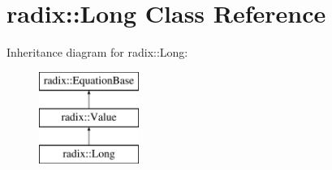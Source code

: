 \hypertarget{classradix_1_1Long}{}\section{radix\+:\+:Long Class Reference}
\label{classradix_1_1Long}
Inheritance diagram for radix\+:\+:Long\+:\begin{figure}[H]
\begin{center}
\leavevmode
\includegraphics[height=3.000000cm]{classradix_1_1Long}
\end{center}
\end{figure}
